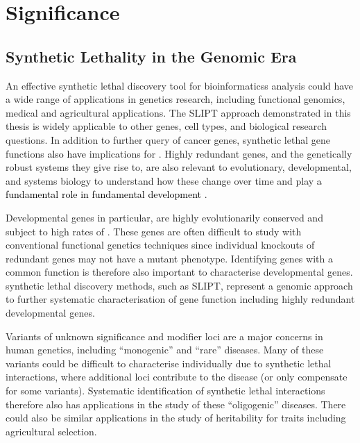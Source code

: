
\section{Significance}
\label{chapt6:significance}

\subsection{Synthetic Lethality in the Genomic Era}
\label{chapt6:significance_genetics}

An effective \gls{synthetic lethal} discovery tool for \glspl{bioinformatics} analysis could have a wide range of applications in genetics research, including functional \glspl{genomic}, medical and agricultural applications.  The \gls{SLIPT} approach demonstrated in this thesis is widely applicable to other genes, cell types, and biological research questions. In addition to further query of cancer genes,  \gls{synthetic lethal} gene functions \textcolor{black}{also have} implications for . Highly redundant genes, and the genetically robust systems they give rise to, are also relevant to evolutionary, developmental, and systems biology to understand how these change over time and play \textcolor{black}{a fundamental role in fundamental development} \citep{Nowak1997, Boone2007, Tischler2008}.

Developmental genes in particular, are highly evolutionarily conserved and subject to high rates of  \citep{Nowak1997, Kockel1997,Fromental-Ramain1996}. These genes are often difficult to study with conventional functional genetics techniques since individual knockouts of redundant genes may not have a \gls{mutant} phenotype. Identifying genes with a common function is therefore also important to characterise developmental genes. \Gls{synthetic lethal} discovery methods, such as \gls{SLIPT}, represent a \gls{genomic} approach to further systematic characterisation of gene function including highly redundant developmental genes.

Variants of unknown significance and modifier loci are a major concerns in human genetics, including ``monogenic'' and ``rare'' diseases. Many of these variants could be difficult to characterise individually due to \gls{synthetic lethal} interactions, where additional loci contribute to the disease (or only compensate for some variants). Systematic identification of \gls{synthetic lethal} interactions therefore also has applications in the study of these ``oligogenic'' diseases. There could also be similar applications in the study of heritability for traits including agricultural  selection.

